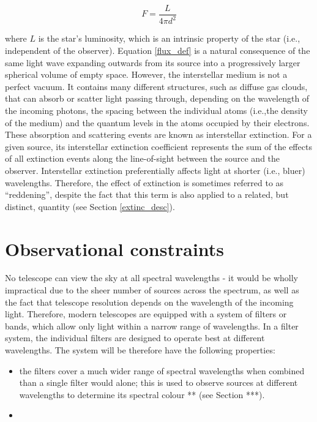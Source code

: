 \documentclass[12pt, a4paper]{report}
\begin{document}
\begin{equation}
\label{flux_def}
F = \frac{L}{4 \pi d^{2}}
\end{equation}

where $L$ is the star's luminosity, which is an intrinsic property of the star (i.e., independent of the observer). Equation \ref{flux_def} is a natural consequence of the same light wave expanding outwards from its source into a progressively larger spherical volume of empty space.
However, the interstellar medium is not a perfect vacuum. It contains many different structures, such as diffuse gas clouds, that can absorb or scatter light passing through, depending on the wavelength of the incoming photons, the spacing between the individual atoms (i.e.,the density of the medium) and the quantum levels in the atoms occupied by their electrons. These absorption and scattering events are known as interstellar extinction. For a given source, its interstellar extinction coefficient represents the sum of the effects of all extinction events along the line-of-sight between the source and the observer.
Interstellar extinction preferentially affects light at shorter (i.e., bluer) wavelengths. Therefore, the effect of extinction is sometimes referred to as ``reddening'', despite the fact that this term is also applied to a related, but distinct, quantity (see Section \ref{extinc_desc}).

\section{Observational constraints}
No telescope can view the sky at all spectral wavelengths - it would be wholly impractical due to the sheer number of sources across the spectrum, as well as the fact that telescope resolution depends on the wavelength of the incoming light. Therefore, modern telescopes are equipped with a system of filters or bands, which allow only light within a narrow range of wavelengths. In a filter system, the individual filters are designed to operate best at different wavelengths. The system will be therefore have the following properties:

\begin{itemize}
\item the filters cover a much wider range of spectral wavelengths when combined than a single filter would alone; this is used to observe sources at different wavelengths to determine its spectral colour ** (see Section ***).
\item 
\end{itemize}
\end{document}
